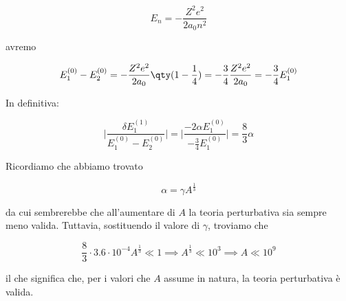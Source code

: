 \begin{soluzione}
   \begin{equation*}
      E_n=-\frac{Z^2 e^2}{2 a_0 n^2}
   \end{equation*}

   avremo

   \begin{equation*}
      E_1^{(0)} - E_{2}^{(0)}
      =-\frac{Z^2 e^2}{2 a_0} \qty( 1 - \frac{1}{4} )
      =-\frac{3}{4} \frac{Z^2 e^2}{2 a_0}
      =-\frac{3}{4} E_1^{(0)}
   \end{equation*}

   In definitiva:

   \begin{equation*}
      \biggl| \frac{ \delta E_1^{(1)} }{ E_1^{(0)} - E_{2}^{(0)} } \biggr|
      =\biggl| \frac{ -2 \alpha E_1^{(0)} }{ -\frac{3}{4} E_1^{(0)} } \biggr|
      =\frac{8}{3} \alpha
   \end{equation*}

   Ricordiamo che abbiamo trovato

   \begin{equation*}
      \alpha=\gamma A^{\frac{1}{3}}
   \end{equation*}

   da cui sembrerebbe che all'aumentare di $A$ la teoria perturbativa sia sempre meno valida. Tuttavia, sostituendo il valore di $\gamma$, troviamo che

   \begin{equation*}
      \frac{8}{3} \cdot 3.6 \cdot 10^{-4} A^{\frac{1}{3}} \ll 1
      \implies
      A^{\frac{1}{3}} \ll 10^3
      \implies
      A \ll 10^9
   \end{equation*}

   il che significa che, per i valori che $A$ assume in natura, la teoria perturbativa è valida.
\end{soluzione}

\newpage

